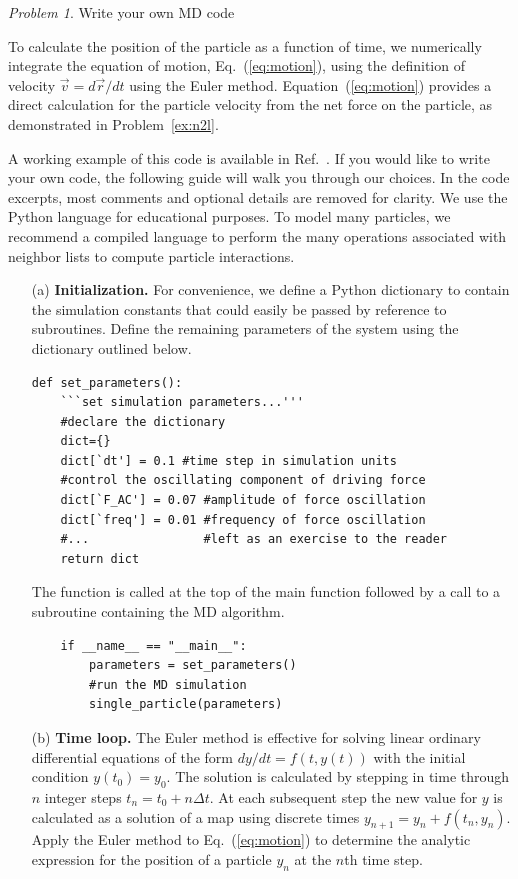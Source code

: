 \documentclass[preprint,showpacs,preprintnumbers,amsmath,amssymb,aps,prb]{revtex4-1}
\theoremstyle{remark}
\newtheorem{problem}{Problem}
\begin{document}
\begin{problem}{Write your own MD code}
  \label{ex:euler}
 
  \noindent To calculate the position of the particle
  as a function of time,
  we
  numerically integrate the equation of motion,
  Eq.~(\ref{eq:motion}),
  using
  the  definition of velocity
  $\vec{v} = d\vec{r}/dt$ 
  using the 
  Euler method.
  Equation~(\ref{eq:motion}) provides
  a direct calculation for the particle velocity
  from the net force on the particle,
  as demonstrated in Problem~\ref{ex:n2l}.

  A working example of this code is available
  in Ref.~.
  If you would like to write your own code,
  the following guide
  will walk you through our choices.
  In the code excerpts,
  most comments and optional details are removed for clarity.
We use the Python 
  language
  for educational purposes.
  To model many particles,
we recommend a   
  compiled  language
  to perform the many operations associated
  with neighbor lists to compute particle interactions.
  
  \begin{enumerate}
    
  \item[(a)] {\bf Initialization.}
    For convenience,
    we define a Python dictionary
    to contain the simulation constants
    that could easily be passed by reference
    to subroutines.
 Define 
    the remaining parameters of the system using the dictionary outlined below.
    \begin{verbatim}
def set_parameters():           
    ```set simulation parameters...'''
    #declare the dictionary     
    dict={}  
    dict[`dt'] = 0.1 #time step in simulation units
    #control the oscillating component of driving force
    dict[`F_AC'] = 0.07 #amplitude of force oscillation
    dict[`freq'] = 0.01 #frequency of force oscillation
    #...                #left as an exercise to the reader
    return dict
    \end{verbatim}

    The function is called at the top of the main function
    followed by a call to a subroutine
    containing the  MD algorithm.
     \begin{verbatim}
    if __name__ == "__main__":
        parameters = set_parameters()
        #run the MD simulation
        single_particle(parameters)
\end{verbatim}

   \item[(b)] {\bf Time loop.}
     The Euler method is effective
     for solving linear ordinary differential  equations
     of the form
     $dy/dt = f(t,y(t))$ with the initial condition $y(t_0) = y_0$.
     The solution is calculated 
     by stepping in time through $n$ integer steps
     $t_n = t_0 + n \Delta t$.
     At each subsequent step the new
     value for $y$ is calculated as a  solution of a map using
     discrete times 
     $y_{n+1} = y_n + f(t_n,y_n)$.
     Apply the Euler method to 
     Eq.~(\ref{eq:motion})
     to determine  the analytic expression
     for the position of a particle
     $y_n$ at the $n$th time step.
  

\end{enumerate}
\end{problem}
\end{document}
